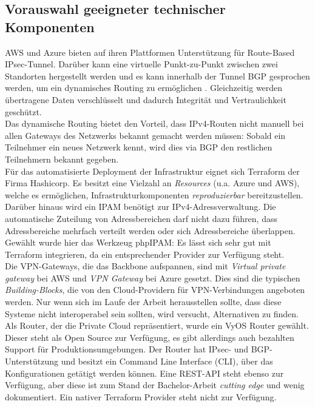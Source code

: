 \subsection{Vorauswahl geeigneter technischer Komponenten}
AWS und Azure bieten auf ihren Plattformen Unterstützung für Route-Based \gls{IPsec}-Tun\-nel\cite[S.32]{awsvpn2021}. Darüber kann eine virtuelle Punkt-zu-Punkt zwischen zwei Standorten hergestellt werden und es kann innerhalb der Tunnel \gls{BGP} gesprochen werden, um ein dynamisches Routing zu ermöglichen\cite[S. 18]{AlShawi2020} \cite[S. 74-79]{Toroman2019}. Gleichzeitig werden übertragene Daten verschlüsselt und dadurch Integrität und Vertraulichkeit geschützt.\\
Das dynamische Routing bietet den Vorteil, dass IPv4-Routen nicht manuell bei allen Gateways des Netzwerks bekannt gemacht werden müssen: Sobald ein Teilnehmer ein neues Netzwerk kennt, wird dies via \gls{BGP} den restlichen Teilnehmern bekannt gegeben.\\
Für das automatisierte \gls{Deployment} der Infrastruktur eignet sich Terraform der Firma Hashicorp. Es besitzt eine Vielzahl an \textit{Resources} (u.a. Azure und AWS), welche es ermöglichen, Infrastrukturkomponenten \textit{reproduzierbar} bereitzustellen.\\
Darüber hinaus wird ein \gls{IPAM} benötigt zur IPv4-Adressverwaltung. Die automatische Zuteilung von Adressbereichen darf nicht dazu führen, dass Adressbereiche mehrfach verteilt werden oder sich Adressbereiche überlappen. Gewählt wurde hier das Werkzeug phpIPAM\cite{phpipam2020}: Es lässt sich sehr gut mit Terraform integrieren, da ein entsprechender Provider zur Verfügung steht\cite{phpipamtf2020}.\\
Die \gls{VPN-Gateway}s, die das \gls{Backbone} aufspannen, sind mit \textit{Virtual private gateway} bei AWS und \textit{VPN Gateway} bei Azure gesetzt. Dies sind die typischen \textit{Building-Blocks}, die von den Cloud-Providern für \gls{VPN}-Verbindungen angeboten werden. Nur wenn sich im Laufe der Arbeit herausstellen sollte, dass diese Systeme nicht interoperabel sein sollten, wird versucht, Alternativen zu finden.\\
Als Router, der die Private Cloud repräsentiert, wurde ein VyOS Router gewählt. Dieser steht als Open Source zur Verfügung, es gibt allerdings auch bezahlten Support für Produktionsumgebungen. Der Router hat \gls{IPsec}- und \gls{BGP}-Unterstützung und besitzt ein Command Line Interface (CLI), über das Konfigurationen getätigt werden können. Eine REST-API steht ebenso zur Verfügung, aber diese ist zum Stand der Bachelor-Arbeit \textit{cutting edge} und wenig dokumentiert\cite{vyosapi2021}. Ein nativer Terraform Provider steht nicht zur Verfügung.\\
